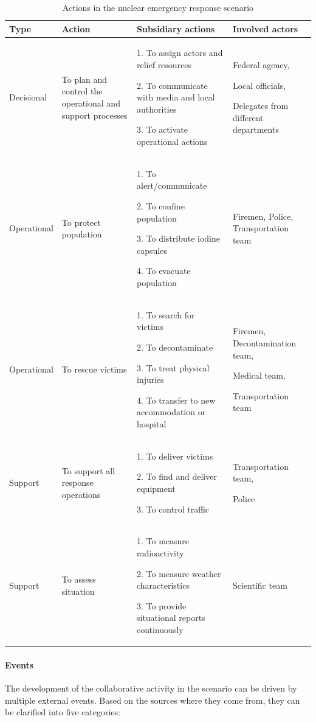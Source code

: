 \begin{table}[htbp]
\centering
\footnotesize
\begin{tabular}{>{\raggedright}p{0.8in}>{\raggedright}p{1.7in}>{\raggedright}p{2in}>{\raggedright}p{1in}}

\toprule 
\textbf{Type} & \textbf{Action} & \textbf{Subsidiary actions} & \textbf{Involved actors}\tabularnewline
\midrule 
Decisional & To plan and control the operational and support processes & 1. To assign actors and relief resources

2. To communicate with media and local authorities 

3. To activate operational actions & Federal agency,

Local officials,

Delegates from different departments\tabularnewline
\midrule 
Operational & To protect population & 1. To alert/communicate

2. To confine population

3. To distribute iodine capsules

4. To evacuate population & Firemen, Police, Transportation team\tabularnewline
\midrule 
Operational & To rescue victims & 1. To search for victims

2. To decontaminate

3. To treat physical injuries

4. To transfer to new accommodation or hospital & Firemen, Decontamination team,

Medical team,

Transportation team\tabularnewline
\midrule 
Support & To support all response operations & 1. To deliver victims

2. To find and deliver equipment

3. To control traffic & Transportation team, 

Police\tabularnewline
\midrule 
Support & To assess situation & 1. To measure radioactivity

2. To measure weather characteristics

3. To provide situational reports continuously & Scientific team\tabularnewline
\bottomrule

\end{tabular}	
\caption{Actions in the nuclear emergency response scenario}
\label{tab:actions_in_scenario}
\end{table}


\paragraph*{Events} %
\label{par:events}
The development of the collaborative activity in the scenario can be driven by multiple external events. Based on the sources where they come from, they can be clarified into five categories:

